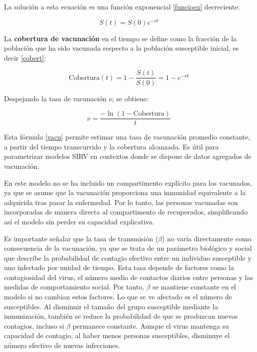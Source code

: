 \begin{itemize}
La solución a esta ecuación es una función exponencial \eqref{funcioex} decreciente:

\begin{equation}
S(t) = S(0) e^{-\nu t}
\label{funcioex}
\end{equation}

La \textbf{cobertura de vacunación} en el tiempo se define como la fracción de la población que ha sido vacunada respecto a la población susceptible inicial, es decir \eqref{cobert}:

\begin{equation}
\text{Cobertura}(t) = 1 - \frac{S(t)}{S(0)} = 1 - e^{-\nu t}
\label{cobert}
\end{equation}

Despejando la tasa de vacunación $\nu$, se obtiene:

\begin{equation}
\nu = \frac{-\ln(1 - \text{Cobertura})}{t}
\label{vacu}
\end{equation}

Esta fórmula \eqref{vacu} permite estimar una tasa de vacunación promedio constante, a partir del tiempo transcurrido y la cobertura alcanzada. Es útil para parametrizar modelos SIRV en contextos donde se dispone de datos agregados de vacunación.





\end{itemize}

En este modelo no se ha incluido un compartimento explícito para los vacunados, ya que se asume que la vacunación proporciona una inmunidad equivalente a la adquirida tras pasar la enfermedad. Por lo tanto, las personas vacunadas son incorporadas de manera directa al compartimento de recuperados, simplificando así el modelo sin perder su capacidad explicativa. 

Es importante señalar que la tasa de transmisión ($\beta$) no varía directamente como consecuencia de la vacunación, ya que se trata de un parámetro biológico y social que describe la probabilidad de contagio efectivo entre un individuo susceptible y uno infectado por unidad de tiempo. Esta tasa depende de factores como la contagiosidad del virus, el número medio de contactos diarios entre personas y las medidas de comportamiento social.
Por tanto, $\beta$ se mantiene constante en el modelo si no cambian estos factores. Lo que se ve afectado es el número de susceptibles. Al disminuir el tamaño del grupo susceptible mediante la inmunización, también se reduce la probabilidad de que se produzcan nuevos contagios, incluso si $\beta$ permanece constante. Aunque el virus mantenga su capacidad de contagio, al haber menos personas susceptibles, disminuye el número efectivo de nuevas infecciones.


